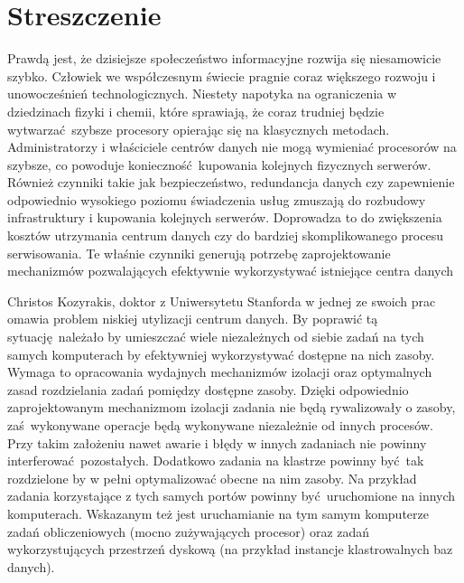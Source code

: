 \documentclass[10pt,a4paper,titlepage,twoside]{report}
\begin{document}
%


\setlength{\parindent}{1.25cm}


\setcounter{page}{3}
\onehalfspacing
\justify
\section*{Streszczenie}
\indent\indent Prawdą jest, że dzisiejsze społeczeństwo informacyjne rozwija się niesamowicie szybko. Człowiek we współczesnym świecie pragnie coraz większego rozwoju i unowocześnień technologicznych. Niestety napotyka na ograniczenia w dziedzinach fizyki i chemii, które sprawiają, że coraz trudniej będzie wytwarzać szybsze procesory opierając się na klasycznych metodach. Administratorzy i właściciele centrów danych nie mogą wymieniać procesorów na szybsze, co powoduje konieczność kupowania kolejnych fizycznych serwerów. Również czynniki takie jak bezpieczeństwo, redundancja danych czy zapewnienie odpowiednio wysokiego poziomu świadczenia usług zmuszają do rozbudowy infrastruktury i kupowania kolejnych serwerów. Doprowadza to do zwiększenia kosztów utrzymania centrum danych czy do bardziej skomplikowanego procesu serwisowania. Te właśnie czynniki generują potrzebę zaprojektowanie mechanizmów pozwalających efektywnie wykorzystywać istniejące centra danych

 Christos Kozyrakis, doktor z Uniwersytetu Stanforda w jednej ze swoich prac omawia problem niskiej utylizacji centrum danych. By poprawić tą sytuację należało by umieszczać wiele niezależnych od siebie zadań na tych samych komputerach by efektywniej wykorzystywać dostępne na nich zasoby. Wymaga to opracowania wydajnych mechanizmów izolacji oraz optymalnych zasad rozdzielania zadań pomiędzy dostępne zasoby. Dzięki odpowiednio zaprojektowanym mechanizmom izolacji zadania nie będą rywalizowały o zasoby, zaś wykonywane operacje będą wykonywane niezależnie od innych procesów. Przy takim założeniu nawet awarie i błędy w innych zadaniach nie powinny interferować pozostałych. Dodatkowo zadania na klastrze powinny być tak rozdzielone by w pełni optymalizować obecne na nim zasoby. Na przykład zadania korzystające z tych samych portów powinny być uruchomione na innych komputerach. Wskazanym też jest uruchamianie na tym samym komputerze zadań obliczeniowych (mocno zużywających procesor) oraz zadań wykorzystujących przestrzeń dyskową (na przykład instancje klastrowalnych baz danych).
\end{document}
